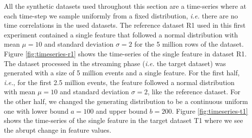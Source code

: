 All the synthetic datasets used throughout this section are a time-series where at each time-step we sample uniformly from a fixed distribution, \textit{i.e.} there are no time correlations in the used datasets. The reference dataset R1 used in this first experiment contained a single feature that followed a normal distribution with mean $\mu=10$ and standard deviation $\sigma=2$ for the 5 million rows of the dataset. Figure \ref{fig:timeseries-r1} shows the time-series of the single feature in dataset R1. The dataset processed in the streaming phase (\textit{i.e.} the target dataset) was generated with a size of 5 million events and a single feature. For the first half, \textit{i.e.}, for the first 2.5 million events, the feature followed a normal distribution with mean $\mu=10$ and standard deviation $\sigma=2$, like the reference dataset. For the other half, we changed the generating distribution to be a continuous uniform one with lower bound $a=100$ and upper bound $b=200$. Figure \ref{fig:timeseries-t1} shows the time-series of the single feature in the target dataset T1 where we see the abrupt change in feature values.
